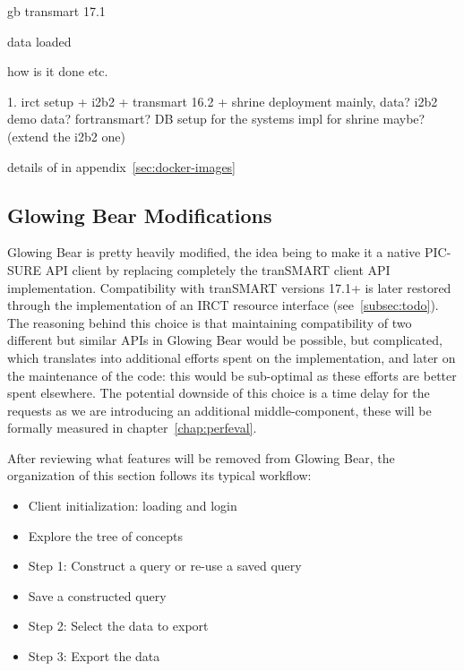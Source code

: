 gb
transmart 17.1

data loaded

how is it done etc.

1. irct setup + i2b2 + transmart 16.2 + shrine
deployment mainly, data? i2b2 demo data? fortransmart? 
DB setup for the systems
impl for shrine maybe? (extend the i2b2 one)

details of in appendix~\ref{sec:docker-images}


\subsection{Glowing Bear Modifications}

Glowing Bear is pretty heavily modified, the idea being to make it a native PIC-SURE API client by replacing completely the tranSMART client API implementation. 
Compatibility with tranSMART versions 17.1+ is later restored through the implementation of an IRCT resource interface (see~\ref{subsec:todo}).
The reasoning behind this choice is that maintaining compatibility of two different but similar APIs in Glowing Bear would be possible, but complicated, which translates into additional efforts spent on the implementation, and later on the maintenance of the code: this would be sub-optimal as these efforts are better spent elsewhere.
The potential downside of this choice is a time delay for the requests as we are introducing an additional middle-component, these will be formally measured in chapter~\ref{chap:perfeval}.

After reviewing what features will be removed from Glowing Bear, the organization of this section follows its typical workflow:
\begin{itemize}
    \item Client initialization: loading and login
    \item Explore the tree of concepts
    \item Step 1: Construct a query or re-use a saved query
    \item Save a constructed query
    \item Step 2: Select the data to export
    \item Step 3: Export the data
\end{itemize}



